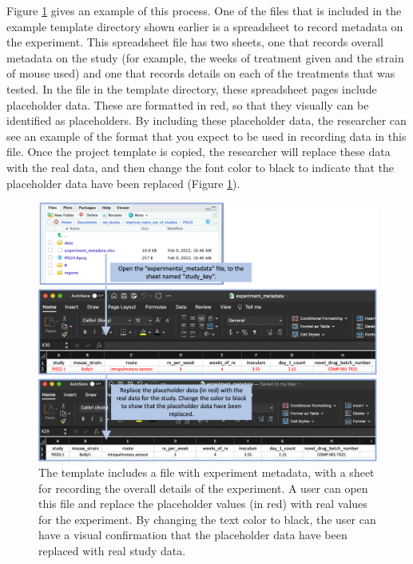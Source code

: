 \documentclass[]{tufte-book}
\begin{document}
Figure \ref{fig:replacingplaceholdermetadata} gives an example of this process.
One of the files that is included in the example template directory shown
earlier is a spreadsheet to record metadata on the experiment. This spreadsheet
file has two sheets, one that records overall metadata on the study (for
example, the weeks of treatment given and the strain of mouse used) and one that
records details on each of the treatments that was tested. In the file in the
template directory, these spreadsheet pages include placeholder data. These are
formatted in red, so that they visually can be identified as placeholders. By
including these placeholder data, the researcher can see an example of the
format that you expect to be used in recording data in this file. Once the
project template is copied, the researcher will replace these data with the real
data, and then change the font color to black to indicate that the placeholder
data have been replaced (Figure \ref{fig:replacingplaceholdermetadata}).

\begin{figure}
\includegraphics[width=\textwidth]{figures/project_replace_placeholder_metadata} \caption[The template includes a file with experiment metadata, with a sheet for recording the overall details of the experiment]{The template includes a file with experiment metadata, with a sheet for recording the overall details of the experiment. A user can open this file and replace the placeholder values (in red) with real values for the experiment. By changing the text color to black, the user can have a visual confirmation that the placeholder data have been replaced with real study data.}\label{fig:replacingplaceholdermetadata}
\end{figure}
\end{document}
